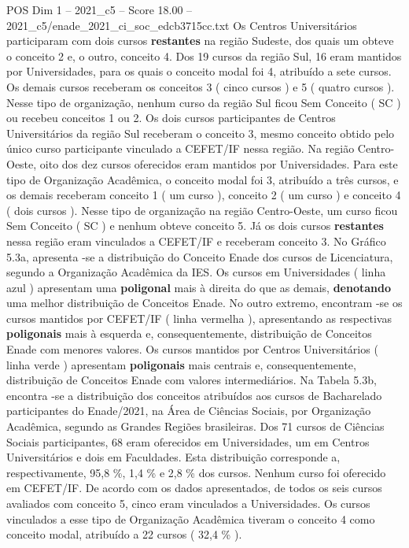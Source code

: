\begin{textsample}{POS Dim 1 – 2021\_c5 – Score 18.00 – 2021\_c5/enade\_2021\_ci\_soc\_edcb3715cc.txt}
Os Centros Universitários participaram com dois cursos \textbf{restantes} na região Sudeste, dos quais um obteve o conceito 2 e, o outro, conceito 4.
Dos 19 cursos da região Sul, 16 eram mantidos por Universidades, para os quais o conceito modal foi 4, atribuído a sete cursos.
Os demais cursos receberam os conceitos 3 ( cinco cursos ) e 5 ( quatro cursos ).
Nesse tipo de organização, nenhum curso da região Sul ficou Sem Conceito ( SC ) ou recebeu conceitos 1 ou 2.
Os dois cursos participantes de Centros Universitários da região Sul receberam o conceito 3, mesmo conceito obtido pelo único curso participante vinculado a CEFET/IF nessa região.
Na região Centro-Oeste, oito dos dez cursos oferecidos eram mantidos por Universidades.
Para este tipo de Organização Acadêmica, o conceito modal foi 3, atribuído a três cursos, e os demais receberam conceito 1 ( um curso ), conceito 2 ( um curso ) e conceito 4 ( dois cursos ).
Nesse tipo de organização na região Centro-Oeste, um curso ficou Sem Conceito ( SC ) e nenhum obteve conceito 5.
Já os dois cursos \textbf{restantes} nessa região eram vinculados a CEFET/IF e receberam conceito 3.
No Gráfico 5.3a, apresenta -se a distribuição do Conceito Enade dos cursos de Licenciatura, segundo a Organização Acadêmica da IES.
Os cursos em Universidades ( linha azul ) apresentam uma \textbf{poligonal} mais à direita do que as demais, \textbf{denotando} uma melhor distribuição de Conceitos Enade.
No outro extremo, encontram -se os cursos mantidos por CEFET/IF ( linha vermelha ), apresentando as respectivas \textbf{poligonais} mais à esquerda e, consequentemente, distribuição de Conceitos Enade com menores valores.
Os cursos mantidos por Centros Universitários ( linha verde ) apresentam \textbf{poligonais} mais centrais e, consequentemente, distribuição de Conceitos Enade com valores intermediários.
Na Tabela 5.3b, encontra -se a distribuição dos conceitos atribuídos aos cursos de Bacharelado participantes do Enade/2021, na Área de Ciências Sociais, por Organização Acadêmica, segundo as Grandes Regiões brasileiras.
Dos 71 cursos de Ciências Sociais participantes, 68 eram oferecidos em Universidades, um em Centros Universitários e dois em Faculdades.
Esta distribuição corresponde a, respectivamente, 95,8 \%, 1,4 \% e 2,8 \% dos cursos.
Nenhum curso foi oferecido em CEFET/IF.
De acordo com os dados apresentados, de todos os seis cursos avaliados com conceito 5, cinco eram vinculados a Universidades.
Os cursos vinculados a esse tipo de Organização Acadêmica tiveram o conceito 4 como conceito modal, atribuído a 22 cursos ( 32,4 \% ).

\end{textsample}
